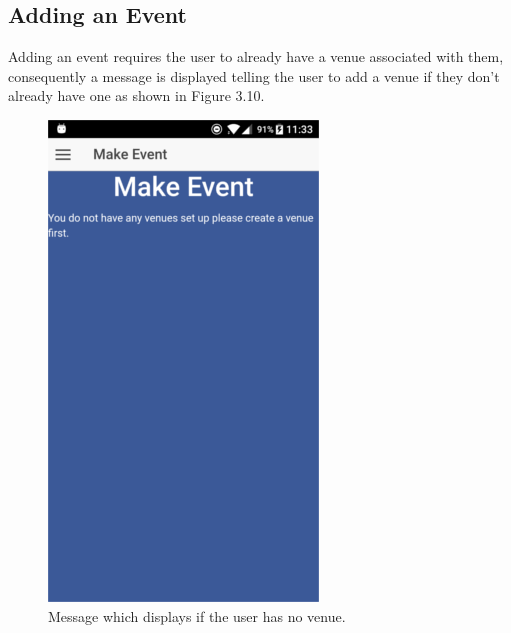 \subsection{Adding an Event}
Adding an event requires the user to already have a venue associated with them, consequently a message is displayed telling the user to add a venue if they don't already have one as shown in Figure 3.10.
\begin{center}
\begin{figure}[H]
\includegraphics[scale=0.5]{images/sc14}
\caption{Message which displays if the user has no venue.}
\end{figure}
\end{center}

